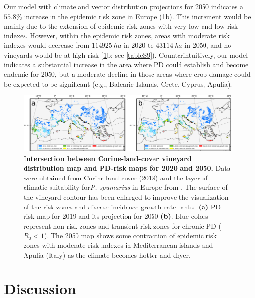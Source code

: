     Our model with climate and vector distribution projections for 2050
    indicates a $ 55.8 \% $ increase in the epidemic risk zone in Europe
    (\cref{fig6}b). This increment would be mainly due to the extension of
    epidemic risk zones with very low and low-risk indexes. However, within the
    epidemic risk zones, areas with moderate risk indexes would decrease from
$\SI{114925}{ha}$ in 2020 to $\SI{43114}{ha}$ in 2050, and no vineyards would
    be at high risk (\cref{fig6}b; see \cref{tableS9}). Counterintuitively,
    our model indicates a substantial increase in the area where PD could
    establish and become endemic for 2050, but a moderate decline in those
    areas where crop damage could be expected to be significant (e.g., Balearic
    Islands, Crete, Cyprus, Apulia).

    \begin{figure}[H]
        \includegraphics[width=1\textwidth]{Figures/Fig6.png}
        \caption[PD risk in European vineyards for 2020 and
            2050]{\textbf{Intersection between Corine-land-cover vineyard
                distribution map and PD-risk maps for 2020 and 2050.}  Data
            were obtained from
            Corine-land-cover (2018) and the layer of climatic suitability
            for\textit{P.
                spumarius} in Europe from \cite{Godefroid2021}. The surface of
            the vineyard
            contour has been enlarged to improve the visualization of the risk
            zones and
            disease-incidence growth-rate ranks. \textbf{(a)} PD risk map for
            2019 and its
            projection for 2050 \textbf{(b)}. Blue colors represent non-risk
            zones and
            transient risk zones for chronic PD ($R_0 < 1$). The 2050 map shows
            some
            contraction of epidemic risk zones with moderate risk indexes in
            Mediterranean
            islands and Apulia (Italy) as the climate becomes hotter and
            dryer.}
        \label{fig6}
    \end{figure}

    \section{Discussion}

